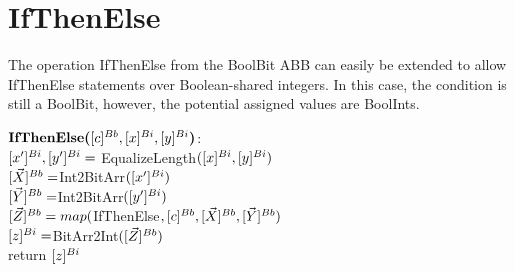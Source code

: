 \section{IfThenElse}

The operation IfThenElse from the BoolBit ABB can easily be extended to 
allow IfThenElse statements over Boolean-shared integers.
In this case, the condition is still a BoolBit, 
however, the potential assigned values are BoolInts.

\begin{protocol}[IfThenElse]

	$\textbf{IfThenElse(}[c]^{Bb}, [x]^{Bi}, [y]^{Bi}\textbf{)}$:\\
	\indent $[x']^{Bi}, [y']^{Bi}=$ EqualizeLength$([x]^{Bi}, [y]^{Bi})$ \\
	\indent $[\vec{X}]^{Bb} = $Int2BitArr$([x']^{Bi})$ \\
	\indent $[\vec{Y}]^{Bb} = $Int2BitArr$([y']^{Bi})$ \\
	\indent $[\vec{Z}]^{Bb} = map($IfThenElse$, [c]^{Bb}, [\vec{X}]^{Bb}, [\vec{Y}]^{Bb})$ \\
	\indent $[z]^{Bi} = $BitArr2Int$([\vec{Z}]^{Bb})$ \\
	\indent return $[z]^{Bi}$

\end{protocol}


